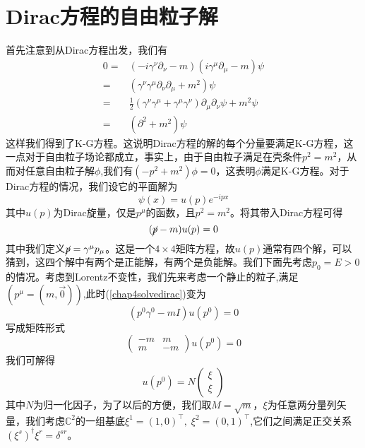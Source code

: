 \section{Dirac方程的自由粒子解}
首先注意到从Dirac方程出发，我们有
\begin{equation}
\begin{aligned}
    0=&(-i\gamma^{\nu}\partial_{\nu}-m)(i\gamma^{\mu}\partial_{\mu}-m)\psi\\
    =&(\gamma^{\nu}\gamma^{\mu}\partial_{\nu}\partial_{\mu}+m^{2})\psi\\
    =&\frac{1}{2}(\gamma^{\nu}\gamma^{\mu}+\gamma^{\mu}\gamma^{\nu})\partial_{\mu}\partial_{\nu}\psi+m^{2}\psi\\
    =&(\partial^{2}+m^{2})\psi
    \end{aligned}
\end{equation}
这样我们得到了K-G方程。这说明Dirac方程的解的每个分量要满足K-G方程，这一点对于自由粒子场论都成立，事实上，由于自由粒子满足在壳条件$p^{2}=m^{2}$，从而对任意自由粒子解$\phi$,我们有$(-p^{2}+m^{2})\phi=0$，这表明$\phi$满足K-G方程。对于Dirac方程的情况，我们设它的平面解为
\begin{equation}
    \psi(x)=u(p)e^{-ipx}
\end{equation}
其中$u(p)$为Dirac旋量，仅是$p^{\mu}$的函数，且$p^{2}=m^{2}$。将其带入Dirac方程可得
\begin{equation}
\label{chap4solvedirac}
    (\cancel{p}-m)u(p)=0
\end{equation}
其中我们定义$\cancel{p}=\gamma^{\mu}p_{\mu}$。这是一个$4\times 4$矩阵方程，故$u(p)$通常有四个解，可以猜到，这四个解中有两个是正能解，有两个是负能解。我们下面先考虑$p_{0}=E>0$的情况。考虑到Lorentz不变性，我们先来考虑一个静止的粒子,满足$(p^{\mu}=(m,\vec{0}))$,此时(\ref{chap4solvedirac})变为
\begin{equation}
\label{chap4solvdirac222}
    (p^{0}\gamma^{0}-mI)u(p^{0})=0
\end{equation}
写成矩阵形式
\begin{equation}
\left(\begin{array}{cc}
    -m &m  \\
     m& -m
\end{array}\right)u(p^{0})=0
\end{equation}
我们可解得
\begin{equation}
   u(p^{0})=N\left( \begin{array}{cc}
        \xi   \\
          \xi
    \end{array}\right)
\end{equation}
其中$N$为归一化因子，为了以后的方便，我们取$M=\sqrt{m}$，$\xi$为任意两分量列矢量，我们考虑$\mathbb{C}^{2}$的一组基底$\xi^{1}=(1,0)^{\top},\;\xi^{2}=(0,1)^{\top}$,它们之间满足正交关系$(\xi^{s})^{\dagger}\xi^{r}=\delta^{sr}$。

